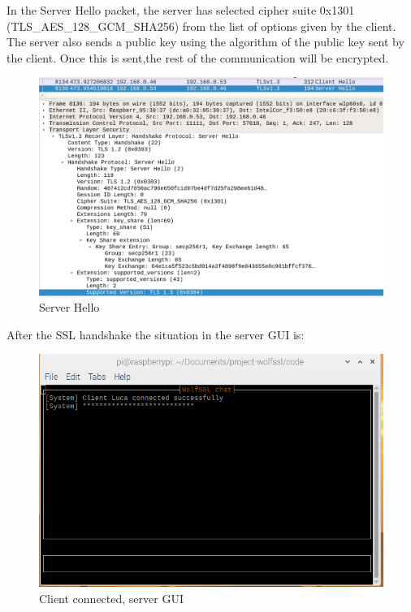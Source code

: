 \documentclass[a4paper,12pt]{article}
\begin{document}
In the Server Hello packet, the server has selected cipher suite 0x1301 (TLS\_AES\_128\_GCM\_SHA256) from the list of options given by the client.
The server also sends a public key using the algorithm of the public key sent by the client. Once this is sent,the rest of the communication will be encrypted.

\begin{figure}[H]
    \centering
    \includegraphics[scale=0.248]{./code/img/server-hello.png}
    \caption{Server Hello}
    
\end{figure}


After the SSL handshake the situation in the server GUI is:
\begin{figure}[H]
    \centering
    \includegraphics[scale=0.6]{./code/img/2-server.png}
    \caption{Client connected, server GUI}
    
\end{figure}
\end{document}
